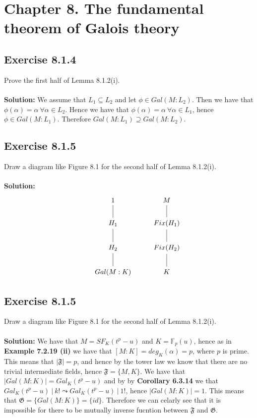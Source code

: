 \documentclass{article}
\begin{document}
\section*{Chapter 8. The fundamental theorem of Galois theory}
\subsection*{Exercise 8.1.4}
Prove the first half of Lemma 8.1.2(i).
\\\\
\textbf{Solution:}
We assume that $L_1 \subseteq L_2$ and let $\phi \in Gal(M:L_2)$. Then we have that $\phi(\alpha) = \alpha \ \forall \alpha \in L_2$.
Hence we have that $\phi(\alpha) = \alpha \ \forall \alpha \in L_1$, hence $\phi \in Gal(M:L_1)$. Therefore $Gal(M:L_1) \supseteq Gal(M:L_2)$.

\subsection*{Exercise 8.1.5}
Draw a diagram like Figure 8.1 for the second half of
Lemma 8.1.2(i).
\\\\
\textbf{Solution:}
\begin{equation*}
\begin{tikzcd}
    & 1 \arrow[d, dash] & M \arrow[d, dash]\\
    & H_1 \arrow[d, dash] & Fix(H_1) \arrow[d, dash]\\
    & H_2 \arrow[d, dash] & Fix(H_2) \arrow[d, dash]\\
    & Gal(M:K) & K
\end{tikzcd}
\end{equation*}

\subsection*{Exercise 8.1.5}
Draw a diagram like Figure 8.1 for the second half of
Lemma 8.1.2(i).
\\\\
\textbf{Solution:}
We have that $M=SF_K(t^p-u)$ and $K=\mathbb{F}_p(u)$, hence as in \textbf{Example 7.2.19 (ii)} we have that $[M:K] = deg_K(\alpha) = p$, where $p$ is prime.
This means that $|\mathfrak{F}| = p$, and hence by the tower law we know that there are no trivial intermediate fields, hence $\mathfrak{F}=\{M,K\}$.
We have that $|Gal(M:K)| = Gal_K(t^p-u)$ and by by \textbf{Corollary 6.3.14} we that $Gal_K(t^p-u)\ | \ k! \leadsto  Gal_K(t^p-u) \ | \ 1!$, hence $|Gal(M:K)|=1$.
This means that $\mathfrak{G} = \{Gal(M:K)\}=\{id\}$. Therefore we can celarly see that it is impossible for there to be mutually inverse fucntion between
$\mathfrak{F}$ and $\mathfrak{G}$.
\end{document}
